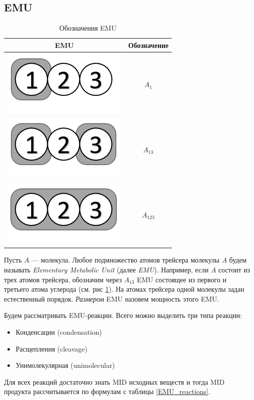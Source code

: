 \documentclass[14pt, a4paper]{extreport}
\begin{document}
\subsection{EMU}

\begin{table}
	\begin{tabular}{c | c}
		EMU & Обозначение\\
		\hline
		\includegraphics[scale=0.6]{emus/EMUA1.png} & $A_1$\\
		\hline
		\includegraphics[scale=0.6]{emus/EMU13.png} & $A_{13}$\\
		\hline
		\includegraphics[scale=0.6]{emus/EMU123.png} & $A_{123}$\\
	\end{tabular}
	\caption{Обозначения EMU}
	\label{EMU}
\end{table}

Пусть $A$ --- молекула. Любое подмножество атомов трейсера молекулы $A$ будем называть \emph{Elementary Metabolic Unit} (далее \emph{EMU}). Например, если $A$ состоит из трех атомов трейсера, обозначим через $A_{13}$ EMU состоящее из первого и третьего атома углерода (см. рис \ref{EMU}). На атомах трейсера одной молекулы задан естественный порядок. \emph{Размером} EMU назовем мощность этого EMU.

Будем рассматривать EMU-реакции. Всего можно выделить три типа реакции: 
\begin{itemize}
	\item Конденсации (condensation)
	\item Расщепления (cleavage)
	\item Унимолекулярная (unimolecular)
\end{itemize}
Для всех реакций достаточно знать MID исходных веществ и тогда MID продукта рассчитывается по формулам с таблицы \ref{EMU_reactions}. 
\end{document}
